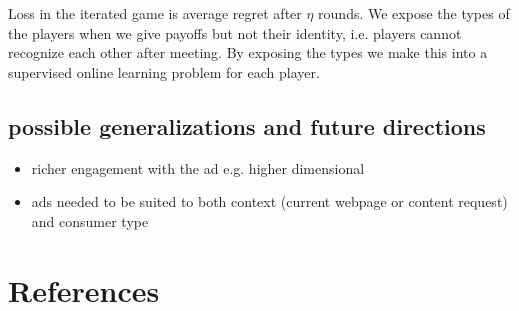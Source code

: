 \documentclass{article}
\begin{document}
Loss in the iterated game is average regret after $\eta$ rounds. We expose the types of the players when we give payoffs but not their identity, i.e. players cannot recognize each other after meeting. By exposing the types we make this into a supervised online learning problem for each player.



\subsection{possible generalizations and future directions}

\begin{itemize}
	\item richer engagement with the ad e.g. higher dimensional
	\item ads needed to be suited to both context (current webpage or content request) and consumer type
\end{itemize}

\section{References}



\end{document}
